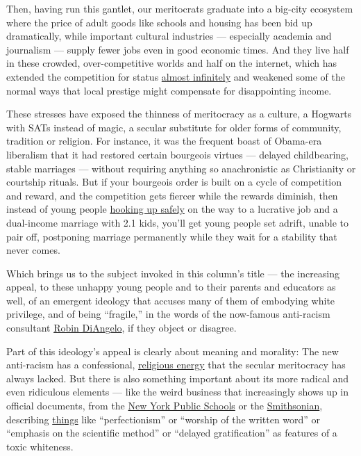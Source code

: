Then, having run this gantlet, our meritocrats graduate into a big-city
ecosystem where the price of adult goods like schools and housing has
been bid up dramatically, while important cultural industries ---
especially academia and journalism --- supply fewer jobs even in good
economic times. And they live half in these crowded, over-competitive
worlds and half on the internet, which has extended the competition for
status
\href{https://www.mercatus.org/bridge/commentary/looking-glass-politics}{almost
infinitely} and weakened some of the normal ways that local prestige
might compensate for disappointing income.

These stresses have exposed the thinness of meritocracy as a culture, a
Hogwarts with SATs instead of magic, a secular substitute for older
forms of community, tradition or religion. For instance, it was the
frequent boast of Obama-era liberalism that it had restored certain
bourgeois virtues --- delayed childbearing, stable marriages --- without
requiring anything so anachronistic as Christianity or courtship
rituals. But if your bourgeois order is built on a cycle of competition
and reward, and the competition gets fiercer while the rewards diminish,
then instead of young people
\href{https://www.theatlantic.com/magazine/archive/2012/09/boys-on-the-side/309062/}{hooking
up safely} on the way to a lucrative job and a dual-income marriage with
2.1 kids, you'll get young people set adrift, unable to pair off,
postponing marriage permanently while they wait for a stability that
never comes.

Which brings us to the subject invoked in this column's title --- the
increasing appeal, to these unhappy young people and to their parents
and educators as well, of an emergent ideology that accuses many of them
of embodying white privilege, and of being ``fragile,'' in the words of
the now-famous anti-racism consultant
\href{https://www.nytimes3xbfgragh.onion/2020/07/15/magazine/white-fragility-robin-diangelo.html}{Robin
DiAngelo}, if they object or disagree.

Part of this ideology's appeal is clearly about meaning and morality:
The new anti-racism has a confessional,
\href{https://www.nytimes3xbfgragh.onion/2020/07/07/opinion/protestant-progressive-reformation.html}{religious
energy} that the secular meritocracy has always lacked. But there is
also something important about its more radical and even ridiculous
elements --- like the weird business that increasingly shows up in
official documents, from the
\href{https://nypost.com/2019/05/20/richard-carranza-held-doe-white-supremacy-culture-training/}{New
York Public Schools} or the
\href{https://twitter.com/ByronYork/status/1283372233730203651}{Smithsonian},
describing
\href{https://www.nytimes3xbfgragh.onion/2020/07/15/magazine/white-fragility-robin-diangelo.html}{things}
like ``perfectionism'' or ``worship of the written word'' or ``emphasis
on the scientific method'' or ``delayed gratification'' as features of a
toxic whiteness.

